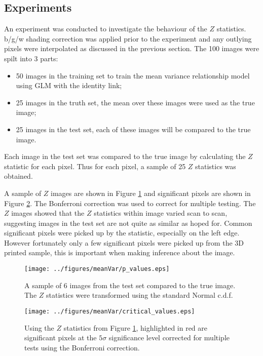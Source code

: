 \documentclass[a4paper]{proc}
\begin{document}
\subsection{Experiments}
An experiment was conducted to investigate the behaviour of the $Z$ statistics. b/g/w shading correction was applied prior to the experiment and any outlying pixels were interpolated as discussed in the previous section. The 100 images were spilt into 3 parts:
\begin{itemize}
	\item 50 images in the training set to train the mean variance relationship model using GLM with the identity link;
	\item 25 images in the truth set, the mean over these images were used as the true image;
	\item 25 images in the test set, each of these images will be compared to the true image.
\end{itemize}
Each image in the test set was compared to the true image by calculating the $Z$ statistic for each pixel. Thus for each pixel, a sample of 25 $Z$ statistics was obtained.

A sample of $Z$ images are shown in Figure \ref{fig:p_values} and significant pixels are shown in Figure \ref{fig:critical_values}. The Bonferroni correction was used to correct for multiple testing. The $Z$ images showed that the $Z$ statistics within image varied scan to scan, suggesting images in the test set are not quite as similar as hoped for. Common significant pixels were picked up by the statistic, especially on the left edge. However fortunately only a few significant pixels were picked up from the 3D printed sample, this is important when making inference about the image.

\begin{figure}
	\centering
	\texttt{[image: ../figures/meanVar/p\_values.eps]}
	\caption{A sample of 6 images from the test set compared to the true image. The $Z$ statistics were transformed using the standard Normal c.d.f.}
	\label{fig:p_values}
\end{figure}

\begin{figure}
	\centering
	\texttt{[image: ../figures/meanVar/critical\_values.eps]}
	\caption{Using the $Z$ statistics from Figure \ref{fig:p_values}, highlighted in red are significant pixels at the $5\sigma$ significance level corrected for multiple tests using the Bonferroni correction.}
	\label{fig:critical_values}
\end{figure}
\end{document}
